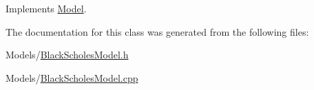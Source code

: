 Implements \hyperlink{class_model_a087d56280bb51e8b04be3a9a30d06c76}{Model}.



The documentation for this class was generated from the following files\+:\begin{DoxyCompactItemize}
\item 
Models/\hyperlink{_black_scholes_model_8h}{Black\+Scholes\+Model.\+h}\item 
Models/\hyperlink{_black_scholes_model_8cpp}{Black\+Scholes\+Model.\+cpp}\end{DoxyCompactItemize}
